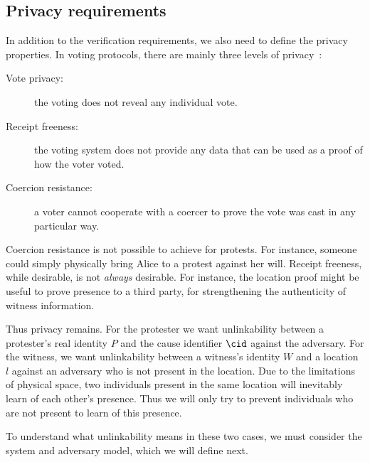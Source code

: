 \subsection{Privacy requirements}%
\label{privacy-properties}

In addition to the verification requirements, we also need to define the 
privacy properties.
In voting protocols, there are mainly three levels of 
privacy~\cite{VerifyingPrivacyPropertiesOfVotingProtocols}:
\begin{description}
  \item[Vote privacy:] the voting does not reveal any individual vote.
  \item[Receipt freeness:] the voting system does not provide any data that can 
    be used as a proof of how the voter voted.
  \item[Coercion resistance:] a voter cannot cooperate with a coercer to prove 
    the vote was cast in any particular way.
\end{description}

Coercion resistance is not possible to achieve for protests.
For instance, someone could simply physically bring Alice to a protest against 
her will.
Receipt freeness, while desirable, is not \emph{always} desirable.
For instance, the location proof might be useful to prove presence to a third 
party, \eg for strengthening the authenticity of witness information.

Thus privacy remains.
For the protester we want unlinkability between a protester's real identity 
\(P\) and the cause identifier \(\cid\) against the adversary.
For the witness, we want unlinkability between a witness's identity \(W\) and a 
location \(l\) against an adversary who is not present in the location.
Due to the limitations of physical space, two individuals present in the same 
location will inevitably learn of each other's presence.
Thus we will only try to prevent individuals who are not present to learn of 
this presence.

To understand what unlinkability means in these two cases, we must consider the 
system and adversary model, which we will define next.


